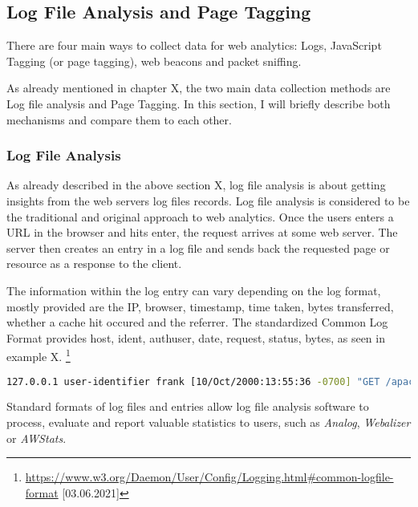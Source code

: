 \subsection{Log File Analysis and Page Tagging}
There are four main ways to collect data for web analytics: Logs, JavaScript Tagging (or page tagging), web beacons and packet sniffing. %

As already mentioned in chapter X,  the two main data collection methods are Log file analysis and Page Tagging.
In this section, I will briefly describe both mechanisms and compare them to each other.


\subsubsection{Log File Analysis}

As already described in the above section X, log file analysis is about getting insights from the web servers log files records.
Log file analysis is considered to be the traditional and original approach to web analytics. %
Once the users enters a URL in the browser and hits enter, the request arrives at some web server.
The server then creates an entry in a log file and sends back the requested page or resource as a response to the client. %

The information within the log entry can vary depending on the log format, mostly provided are the IP, browser, timestamp, time taken, bytes transferred, whether a cache hit occured and the referrer. %
The standardized Common Log Format provides host, ident, authuser, date, request, status, bytes, as seen in example X. \footnote{\url{https://www.w3.org/Daemon/User/Config/Logging.html\#common-logfile-format} [03.06.2021]}

\begin{center}
\begin{lstlisting}[caption={Position 1}, language=bash, numbers=none, basicstyle=\tiny]
127.0.0.1 user-identifier frank [10/Oct/2000:13:55:36 -0700] "GET /apache_pb.gif HTTP/1.0" 200 2326
\end{lstlisting}
\end{center}

Standard formats of log files and entries allow log file analysis software to process, evaluate and report valuable statistics to users, such as \textit{Analog}, \textit{Webalizer} or \textit{AWStats}. %


